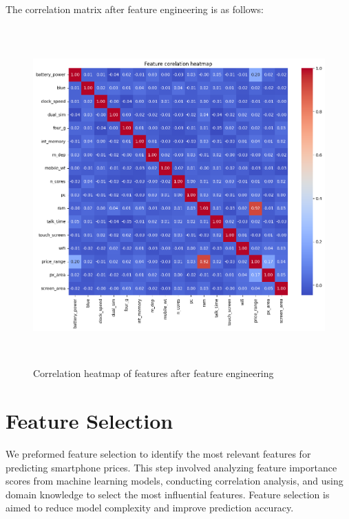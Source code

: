 \documentclass[12pt]{report}
\begin{document}
The correlation matrix after feature engineering is as follows:
\begin{figure}[H]
	\centering
	\includegraphics[height=35em]{corr_viz_after_fe.png}
	\caption{Correlation heatmap of features after feature engineering}
	\label{corr_viz_after_feature_engineering}
\end{figure}

\section{Feature Selection}
We preformed feature selection to identify the most relevant features for predicting smartphone prices. This step involved analyzing feature importance scores from machine learning models, conducting correlation analysis, and using domain knowledge to select the most influential features. Feature selection is aimed to reduce model complexity and improve prediction accuracy.
\end{document}
